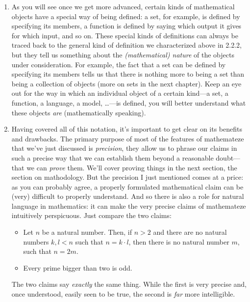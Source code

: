\begin{enumerate}[{\thesection}.1]
		\item As you will see once we get more advanced, certain kinds of mathematical objects have a special way of being defined: a set, for example, is defined by specifying its members, a function is defined by saying which output it gives for which input, and so on. These special kinds of definitions can always be traced back to the general kind of definition we characterized above in 2.2.2, but they tell us something about the \emph{(mathematical) nature} of the objects under consideration. For example, the fact that a set can be defined by specifying its members tells us that there is nothing more to being a set than being a collection of objects (more on sets in the next chapter). Keep an eye out for the way in which an individual object of a certain kind---a set, a function, a language, a model, \dots---is defined, you will better understand what these objects \emph{are} (mathematically speaking).
		
		\item Having covered all of this notation, it's important to get clear on its benefits and drawbacks. The primary purpose of most of the features of mathemateze that we've just discussed is \emph{precision}, they allow us to phrase our claims in such a precise way that we can establish them beyond a reasonable doubt---that we can \emph{prove} them. We'll cover proving things in the next section, the section on mathodology. But the precision I just mentioned comes at a price: as you can probably agree, a properly formulated mathematical claim can be (very) difficult to properly understand. And so there is also a role for natural language in mathematics: it can make the very precise claims of mathemateze intuitively perspicuous. Just compare the two claims:
		
		\begin{itemize}
		
			\item Let $n$ be a natural number. Then, if $n>2$ and there are no natural numbers $k,l<n$ such that $n=k\cdot l$, then there is no natural number $m$, such that $n=2m$.
			
			\item Every prime bigger than two is odd.
		
		\end{itemize}
		
The two claims say \emph{exactly} the same thing. While the first is very precise and, once understood, easily seen to be true, the second is \emph{far} more intelligible. 


\end{enumerate}
